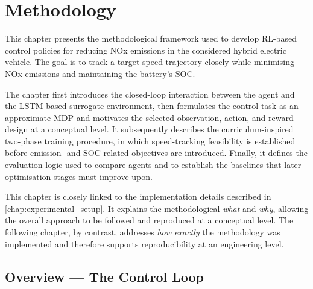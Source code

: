 \chapter{Methodology}
\label{chap:methodology}

This chapter presents the methodological framework used to develop \ac{RL}-based control policies for reducing \ac{NOx} emissions in the considered hybrid electric vehicle. The goal is to track a target speed trajectory closely while minimising \ac{NOx} emissions and maintaining the battery's \ac{SOC}.

The chapter first introduces the closed-loop interaction between the agent and the \ac{LSTM}-based surrogate environment, then formulates the control task as an approximate \ac{MDP} and motivates the selected observation, action, and reward design at a conceptual level. It subsequently describes the curriculum-inspired two-phase training procedure, in which speed-tracking feasibility is established before emission- and \ac{SOC}-related objectives are introduced. Finally, it defines the evaluation logic used to compare agents and to establish the baselines that later optimisation stages must improve upon.

This chapter is closely linked to the implementation details described in \autoref{chap:experimental_setup}. It explains the methodological \textit{what} and \textit{why}, allowing the overall approach to be followed and reproduced at a conceptual level. The following chapter, by contrast, addresses \textit{how exactly} the methodology was implemented and therefore supports reproducibility at an engineering level.

\section{Overview — The Control Loop}
\label{sec:method_overview}

